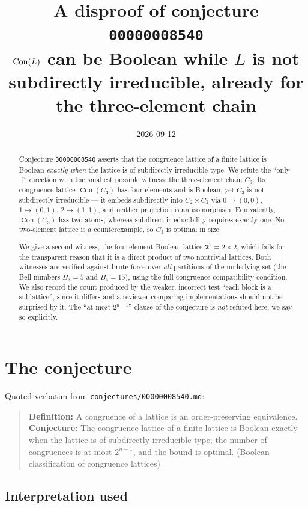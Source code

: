 \documentclass[11pt]{article}
\title{A disproof of conjecture \texttt{00000008540}\\
\large\upshape $\Con(L)$ can be Boolean while $L$ is not subdirectly
irreducible, already for the three-element chain}
\author{}
\date{2026-09-12}
\theoremstyle{definition}
\newcommand{\Con}{\operatorname{Con}}
\begin{document}
\maketitle

\begin{abstract}
Conjecture \texttt{00000008540} asserts that the congruence lattice of a
finite lattice is Boolean \emph{exactly when} the lattice is of subdirectly
irreducible type. We refute the ``only if'' direction with the smallest
possible witness: the three-element chain $C_3$. Its congruence lattice
$\Con(C_3)$ has four elements and is Boolean, yet $C_3$ is not subdirectly
irreducible --- it embeds subdirectly into $C_2 \times C_2$ via
$0 \mapsto (0,0)$, $1 \mapsto (0,1)$, $2 \mapsto (1,1)$, and neither
projection is an isomorphism. Equivalently, $\Con(C_3)$ has two atoms, whereas
subdirect irreducibility requires exactly one. No two-element lattice is a
counterexample, so $C_3$ is optimal in size.

We give a second witness, the four-element Boolean lattice $\mathbf{2}^2 = 2
\times 2$, which fails for the transparent reason that it is a direct product
of two nontrivial lattices. Both witnesses are verified against brute force
over \emph{all} partitions of the underlying set (the Bell numbers $B_3 = 5$
and $B_4 = 15$), using the full congruence compatibility condition. We also
record the count produced by the weaker, incorrect test ``each block is a
sublattice'', since it differs and a reviewer comparing implementations should
not be surprised by it. The ``at most $2^{n-1}$'' clause of the conjecture is
\emph{not} refuted here; we say so explicitly.
\end{abstract}

\section{The conjecture}

Quoted verbatim from \texttt{conjectures/00000008540.md}:

\begin{quote}
\textbf{Definition:} A congruence of a lattice is an order-preserving
equivalence. \textbf{Conjecture:} The congruence lattice of a finite lattice
is Boolean exactly when the lattice is of subdirectly irreducible type; the
number of congruences is at most $2^{n-1}$, and the bound is optimal.
(Boolean classification of congruence lattices)
\end{quote}

\subsection*{Interpretation used}
\end{document}
